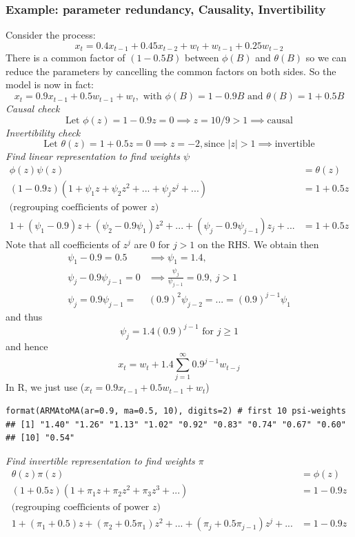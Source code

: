 \documentclass[11pt]{article}
\newcommand{\noi}{\noindent}
\begin{document}
\subsubsection*{Example: parameter redundancy, Causality, Invertibility}
\noi Consider the process:
$$x_t = 0.4x_{t-1} + 0.45x_{t-2} + w_t + w_{t-1} + 0.25w_{t-2}$$
\noi There is a common factor of $(1-0.5B)$ between $\phi(B)$ and $\theta(B)$ so we can reduce the parameters by cancelling the common factors on both sides. So the model is now in fact:
$$x_t = 0.9x_{t-1} + 0.5w_{t-1} + w_t, \text{ with } \phi(B) = 1-0.9B \text{ and } \theta(B) = 1 + 0.5B$$
\noi \textit{Causal check}
$$\text{Let } \phi(z) = 1-0.9z = 0 \implies z = 10/9 > 1 \implies \text{causal}$$
\noi \textit{Invertibility check}
$$\text{Let } \theta(z) = 1 + 0.5z = 0 \implies z = -2, \text{since } |z|>1 \implies \text{invertible}$$
\noi \textit{Find linear representation to find weights $\psi$}
\begin{align*}
    \phi(z)\psi(z) &= \theta(z) \\
    (1-0.9z)(1 + \psi_1z + \psi_2z^2 + ... + \psi_jz^j + ...) &=  1 + 0.5z \\
    \text{(regrouping coefficients of power $z$)}& \\
    1 + (\psi_1 - 0.9)z + (\psi_2 - 0.9\psi_1)z^2 + ... + (\psi_j - 0.9\psi_{j-1})z_j + ... &= 1 + 0.5z
\end{align*}
\noi Note that all coefficients of $z^j$ are $0$ for $j > 1$ on the RHS. We obtain then
\begin{align*}
    \psi_1 - 0.9 = 0.5 &\implies \psi_1 = 1.4, \\
    \psi_j - 0.9\psi_{j-1} = 0 &\implies \frac{\psi_j}{\psi_{j-1}} = 0.9, \: j >1 \\
    \psi_j = 0.9\psi_{j-1} =& (0.9)^2\psi_{j-2} = ... = (0.9)^{j-1}\psi_1
\end{align*}
\noi and thus
$$\psi_j = 1.4(0.9)^{j-1} \text{ for } j \geq 1$$
\noi and hence
$$x_t = w_t + 1.4\sum_{j=1}^{\infty}0.9^{j-1}w_{t-j}$$
\noi In R, we just use ($x_t = 0.9x_{t-1} + 0.5w_{t-1} + w_t$)
\begin{lstlisting}
format(ARMAtoMA(ar=0.9, ma=0.5, 10), digits=2) # first 10 psi-weights
## [1] "1.40" "1.26" "1.13" "1.02" "0.92" "0.83" "0.74" "0.67" "0.60"
## [10] "0.54"
\end{lstlisting}
\noi \textit{Find invertible representation to find weights $\pi$}
\begin{align*}
    \theta(z)\pi(z) &= \phi(z) \\
    (1+0.5z)(1+\pi_1z + \pi_2z^2 + \pi_3z^3 + ...) &= 1 - 0.9z \\
    \text{(regrouping coefficients of power $z$)}& \\
    1 + (\pi_1 + 0.5)z + (\pi_2 + 0.5\pi_1)z^2 + ... + (\pi_j + 0.5\pi_{j-1})z^j + ... &= 1 - 0.9z
\end{align*}
\end{document}
